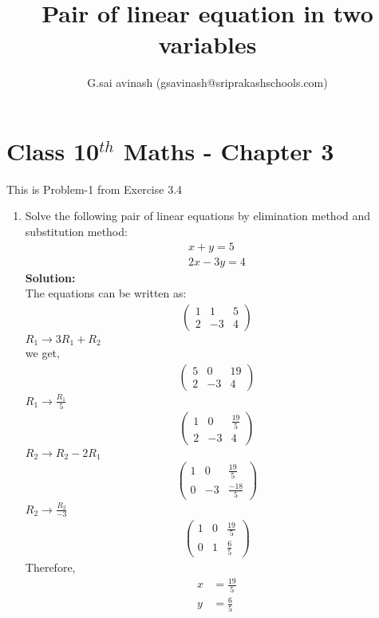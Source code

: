 \documentclass[12pt]{article}
\title{Pair of linear equation in two variables}
\author{G.sai avinash (gsavinash@sriprakashschools.com)}
\newcommand{\myvec}[1]{\ensuremath{\begin{pmatrix}#1\end{pmatrix}}}
\newcommand{\solution}{\noindent \textbf{Solution: }}
\begin{document}
\maketitle
\section*{Class 10$^{th}$ Maths - Chapter 3}
This is Problem-1 from Exercise 3.4
\begin{enumerate}
\item   Solve the following pair of linear equations by elimination method and substitution method:                         
\begin{align}
    x+y=5\\
        2x-3y=4
\end{align}
\solution\\
The equations can be written as:\\
\begin{align}
\myvec{1&1&5\\2&-3&4}
\end{align}
$R_1 \xrightarrow\ 3R_1 + R_2$\\ 
we get,
\begin{align}
\myvec{5&0&19\\2&-3&4}
\end{align}
$R_1 \xrightarrow\ \frac{R_1}{5}$\\ 
\begin{align}
\myvec{1&0&\frac{19}{5}\\2&-3&4}
\end{align}
$R_2 \xrightarrow\ R_2 - 2R_1$\\
\begin{align}
\myvec{1&0&\frac{19}{5}\\0&-3&\frac{-18}{5}}
\end{align}
$R_2 \xrightarrow\ \frac{R_2}{-3}$\\
\begin{align}
\myvec{1&0&\frac{19}{5}\\0&1&\frac{6}{5}}
\end{align}
Therefore,
\begin{align}
  x &= \frac{19}{5}\\
  y &= \frac{6}{5}
\end{align}


\end{enumerate}
\end{document}
